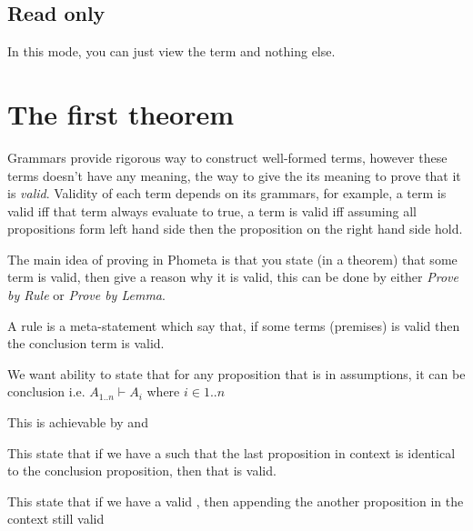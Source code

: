 \documentclass[master.tex]{subfiles}
\begin{document}
\subsection{Read only}
In this mode, you can just view the term and nothing else.

\section{The first theorem}

Grammars provide rigorous way to construct well-formed terms, however these
terms doesn't have any meaning, the way to give the its meaning to prove that it
is \emph{valid}. Validity of each term depends on its grammars, for example,
a  term is valid iff that term always evaluate to true, a
 term is valid iff assuming all propositions form left hand
side then the proposition on the right hand side hold.

The main idea of proving in Phometa is that you state (in a theorem) that some
term is valid, then give a reason why it is valid, this can be done by either
\emph{Prove by Rule} or \emph{Prove by Lemma}.

A rule is a meta-statement which say that, if some terms (premises) is valid
then the conclusion term is valid.

We want ability to state that for any proposition that is in assumptions, it can
be conclusion i.e. $A_{1..n} \vdash A_i$ where $i \in {1..n}$

This is achievable by  and 


This state that if we have a  such that the last proposition in
context is identical to the conclusion proposition, then that 
is valid.


This state that if we have a valid , then appending the another
proposition in the context still valid
\end{document}
